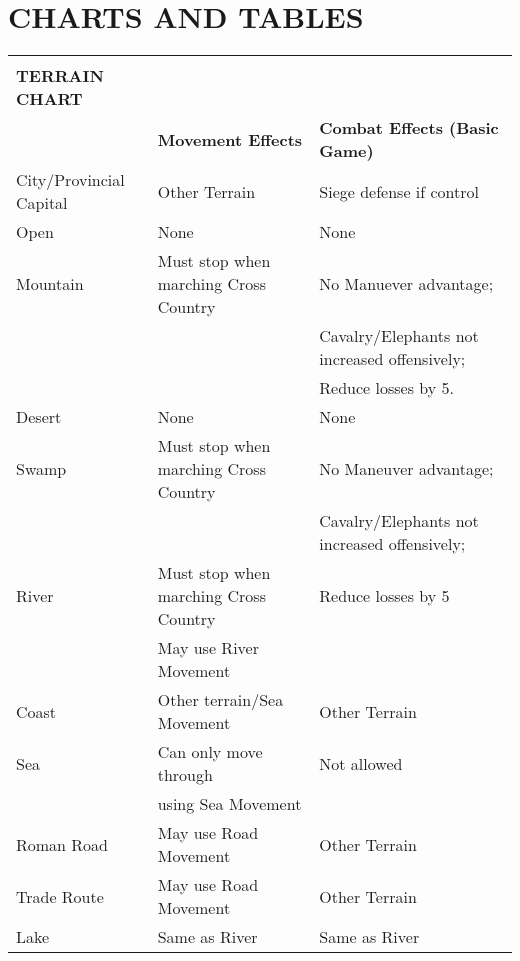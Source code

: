 \clearpage
\section{CHARTS AND TABLES}

\setlength{\arrayrulewidth}{0.6pt}

\begin{strip}
  \begin{tabular}{|lll|}
    \hline & &\\[-2.0ex]
    \textbf{TERRAIN CHART} & &\\
    & \textbf{Movement Effects} & \textbf{Combat Effects (Basic Game)}\\
    City/Provincial Capital & Other Terrain & Siege defense if control\\
    \rowcolor{BabyBlue}Open & None & None\\
    Mountain & Must stop when marching Cross Country & No Manuever advantage;\\
    & & Cavalry/Elephants not increased offensively;\\
    & & Reduce losses by 5.\\
    \rowcolor{BabyBlue}Desert & None & None\\
    Swamp & Must stop when marching Cross Country & No Maneuver advantage;\\
    & & Cavalry/Elephants not increased offensively;\\
    \rowcolor{BabyBlue}River & Must stop when marching Cross Country & Reduce losses by 5\\
    \rowcolor{BabyBlue}& May use River Movement &\\
    Coast & Other terrain/Sea Movement & Other Terrain\\
    \rowcolor{BabyBlue}Sea & Can only move through & Not allowed\\
    \rowcolor{BabyBlue}& using Sea Movement &\\
    Roman Road & May use Road Movement & Other Terrain\\
    \rowcolor{BabyBlue}Trade Route & May use Road Movement & Other Terrain\\
    Lake & Same as River & Same as River\\
    \hline
  \end{tabular}
\end{strip}

